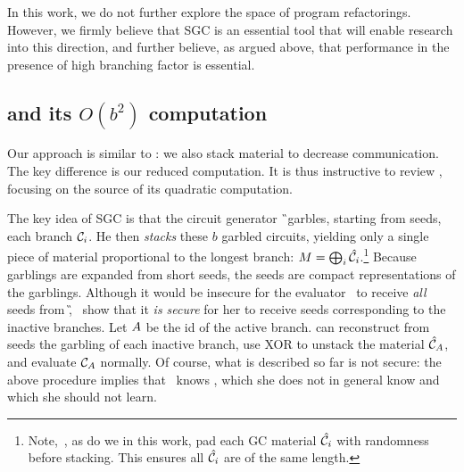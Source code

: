 In this work, we do not further explore the space of program refactorings.
However, we firmly believe that SGC is an essential tool that will
enable research into this direction, and further believe, as argued
above, that performance in the presence of high branching factor is
essential.




\subsection{\HK and its $O(b^2)$ computation}
\label{sec:bsquaredcost}

Our approach is similar to \HK: we also stack material
to decrease communication.
The key difference is our reduced computation.
It is thus instructive to review \HK,
focusing on the source of its quadratic computation.

The key idea of SGC is that the circuit generator \G\ garbles,
starting from seeds, each branch $\mathcal C_i$.
He then \emph{stacks} these $b$ garbled circuits, yielding only a
single piece of material proportional to the longest branch: $M =
\bigoplus_i \hat{\mathcal C}_i$.\footnote{Note,~\HK, as do we in this work,  pad each GC
material $\hat{\mathcal C}_i$ with randomness before stacking.  This ensures all
$\hat{\mathcal C}_i$ are of the same length.}
Because garblings are expanded from short seeds, the
seeds are compact representations of the garblings.
%
Although it would be insecure for the evaluator \E\ to receive
\emph{all} seeds from \G, \HK\ show that it \emph{is secure} for her
to receive seeds corresponding to the inactive branches.
Let $A$ be the id of the active branch.
\E can reconstruct from seeds the garbling of each inactive branch, use XOR to unstack
the material $\hat{\mathcal C}_{A}$, and evaluate $\mathcal C_{A}$ normally.
%
Of course, what is described so far is not secure: the above procedure
implies that \E\ knows \aid, which she does not in general
know and which she should not learn.


